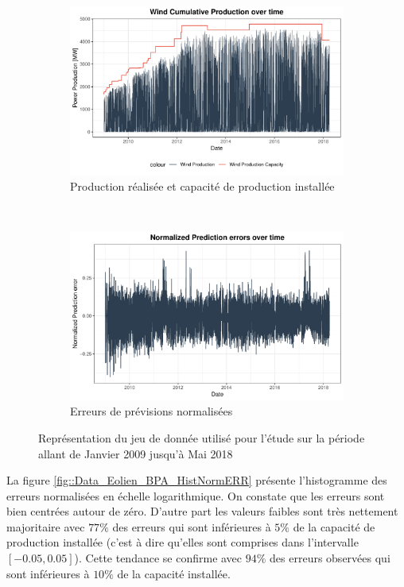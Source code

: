 \documentclass[12pt]{report}
\begin{document}
\begin{figure}[htbp]
\begin{center}
\begin{subfigure}[b]{0.45\textwidth}
	\includegraphics[width=\textwidth]{Images/Data/Eolien/BPA/Normalize.pdf}
	\caption{Production réalisée et capacité de production installée}
	\label{fig::PredErrors_all}
\end{subfigure}
~
\begin{subfigure}[b]{0.45\textwidth}
	\includegraphics[width=\textwidth]{Images/Data/Eolien/BPA/NormWindErrs_All.pdf}
	\caption{Erreurs de prévisions normalisées }
	\label{fig:Data_BPA_WholeNorm}
\end{subfigure}
\caption{Représentation du jeu de donnée utilisé pour l'étude sur la période  allant de Janvier 2009 jusqu'à Mai 2018 }
\label{fig::DataPres}	
\end{center}
\end{figure}

La figure \ref{fig::Data_Eolien_BPA_HistNormERR} présente l'histogramme des erreurs normalisées en échelle logarithmique. On constate que les erreurs sont bien centrées autour de zéro. D'autre part les valeurs faibles sont très nettement majoritaire avec $77 \%$ des erreurs qui sont inférieures à $5 \%$ de la capacité de production installée (c'est à dire qu'elles sont comprises dans l'intervalle $[-0.05,0.05]$). Cette tendance se confirme avec $94 \%$ des erreurs observées qui sont inférieures à $10 \%$ de la capacité installée.
\end{document}
